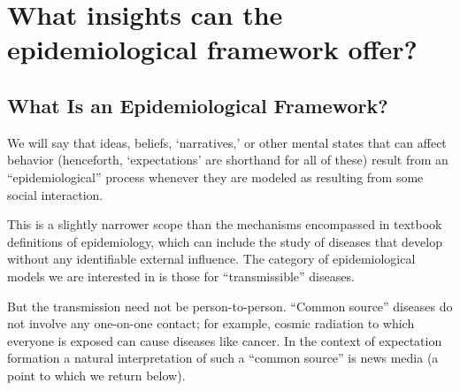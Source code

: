 


\section{What insights can the epidemiological framework
  offer?}\label{what-insights-can-the-epidemiological-framework-offer}

\subsection{What Is an Epidemiological Framework?}
\label{subsec:epi_framework}

We will say that ideas, beliefs, `narratives,' or other mental states that can affect behavior (henceforth, `expectations' are shorthand for all of these) result from an ``epidemiological'' process whenever they are modeled as resulting from some social interaction.

This is a slightly narrower scope than the mechanisms encompassed in textbook
definitions of epidemiology, which can include the study of diseases that develop without any identifiable external influence.  The category of epidemiological models we are interested in is those for ``transmissible'' diseases.

But the transmission need not be person-to-person.   ``Common source''  diseases do not involve any one-on-one contact; for example, cosmic radiation to which everyone is exposed can cause diseases like cancer.  %
In the context of expectation formation a natural interpretation of such a ``common source'' is news media (a point to which we return below).

